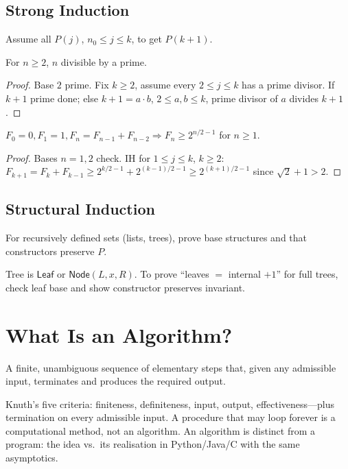 \subsection{Strong Induction} Assume all $P(j)$, $n_0\le j\le k$, to get $P(k+1)$.
\begin{theorem} For $n\ge2$, $n$ divisible by a prime. \end{theorem}
\begin{proof} Base $2$ prime. Fix $k\ge2$, assume every $2\le j\le k$ has a prime divisor. If $k+1$ prime done; else $k+1=a\cdot b$, $2\le a,b\le k$, prime divisor of $a$ divides $k+1$. \end{proof}
\begin{theorem} $F_0=0,F_1=1,F_n=F_{n-1}+F_{n-2}\Rightarrow F_n\ge2^{n/2-1}$ for $n\ge1$. \end{theorem}
\begin{proof} Bases $n=1,2$ check. IH for $1\le j\le k$, $k\ge2$: $F_{k+1}=F_k+F_{k-1}\ge2^{k/2-1}+2^{(k-1)/2-1}\ge2^{(k+1)/2-1}$ since $\sqrt2+1>2$. \end{proof}
\subsection{Structural Induction} For recursively defined sets (lists, trees), prove base structures and that constructors preserve $P$.
\begin{example} Tree is $\mathsf{Leaf}$ or $\mathsf{Node}(L,x,R)$. To prove ``leaves $=$ internal $+1$'' for full trees, check leaf base and show constructor preserves invariant. \end{example}

\section{What Is an Algorithm?}
\label{sec:what-is-algorithm}
\begin{definition} A finite, unambiguous sequence of elementary steps that, given any admissible input, terminates and produces the required output. \end{definition}
Knuth's five criteria: finiteness, definiteness, input, output, effectiveness---plus termination on every admissible input. A procedure that may loop forever is a computational method, not an algorithm. An algorithm is distinct from a program: the idea vs.\ its realisation in Python/Java/C with the same asymptotics.

